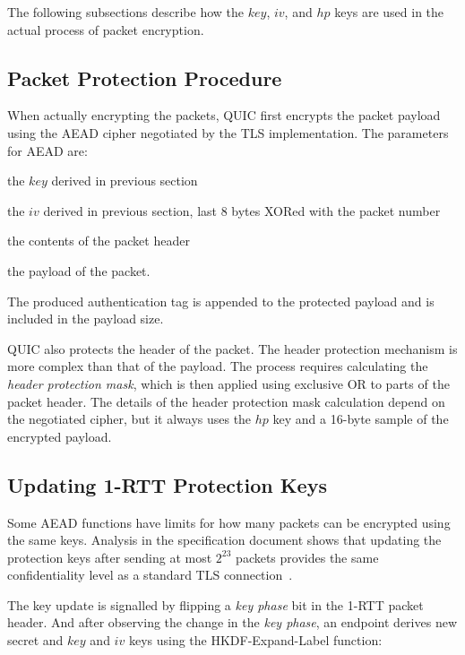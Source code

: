 The following subsections describe how the $key$, $iv$, and $hp$ keys are used in the actual process
of packet encryption.

\subsection{Packet Protection Procedure}

When actually encrypting the packets, QUIC first encrypts the packet payload using the AEAD cipher
negotiated by the TLS implementation. The parameters for AEAD are:

\begin{itemize}

     the $key$ derived in previous section

     the $iv$ derived in previous section, last 8 bytes XORed with the packet number

     the contents of the packet header

     the payload of the packet.

\end{itemize}

The produced authentication tag is appended to the protected payload and is included in the payload
size.

QUIC also protects the header of the packet. The header protection mechanism is more complex than
that of the payload. The process requires calculating the \textit{header protection mask}, which is
then applied using exclusive OR to parts of the packet header. The details of the header protection
mask calculation depend on the negotiated cipher, but it always uses the $hp$ key and a 16-byte
sample of the encrypted payload.


\subsection{Updating 1-RTT Protection Keys}

Some AEAD functions have limits for how many packets can be encrypted using the same keys. Analysis
in the specification document shows that updating the protection keys after sending at most
$2^{23}$ packets provides the same confidentiality level as a standard TLS connection~\cite{draft-ietf-quic-tls}.

The key update is signalled by flipping a \textit{key phase} bit in the 1-RTT packet header. And
after observing the change in the \textit{key phase}, an endpoint derives new secret and $key$ and
$iv$ keys using the HKDF-Expand-Label function:

